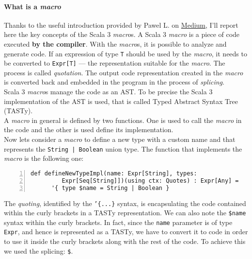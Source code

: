 \paragraph{What is a \textit{macro}}
Thanks to the useful introduction provided by Pawel L. on \href{https://medium.com/codex/scala-3-macros-without-pain-ce54d116880a}{Medium}, I'll report here the key concepts of the Scala 3 \textit{macro}s.
A Scala 3 \textit{macro} is a piece of code executed \textbf{by the compiler}.
With the \textit{macro}s, it is possible to analyze and generate code.
If an expression of type \texttt{T} should be used by the \textit{macro}, it needs to be converted to \texttt{Expr[T]} — the representation suitable for the \textit{macro}.
The process is called \textit{quotation}.
The output code representation created in the \textit{macro} is converted back and embedded in the program in the process of \textit{splicing}.\\
Scala 3 \textit{macro}s manage the code as an AST. To be precise the Scala 3 implementation of the AST is used, that is called Typed Abstract Syntax Tree (TASTy).\\
A \textit{macro} in general is defined by two functions.
One is used to call the \textit{macro} in the code and the other is used define its implementation.\\
Now lets consider a \textit{macro} to define a new type with a custom name and that represents the \texttt{String | Boolean} union type.
The function that implements the \textit{macro} is the following one:\\
\begin{minipage}{\linewidth}
  \begin{lstlisting}[numbers=left, numberstyle=\tiny, numbersep=-5pt, stepnumber=1]
    def defineNewTypeImpl(name: Expr[String], types:
         Expr[Seq[String]])(using ctx: Quotes) : Expr[Any] = 
      '{ type $name = String | Boolean }
  \end{lstlisting}
\end{minipage}
The \textit{quoting}, identified by the \texttt{'\{...\}} syntax, is encapsulating the code contained within the curly brackets in a TASTy representation.
We can also note the \texttt{\$name} syntax within the curly brackets.
In fact, since the \texttt{name} parameter is of type \texttt{Expr}, and hence is represented as a TASTy, we have to convert it to code in order to use it inside the curly brackets along with the rest of the code.
To achieve this we used the splicing: \texttt{\$}.\\
